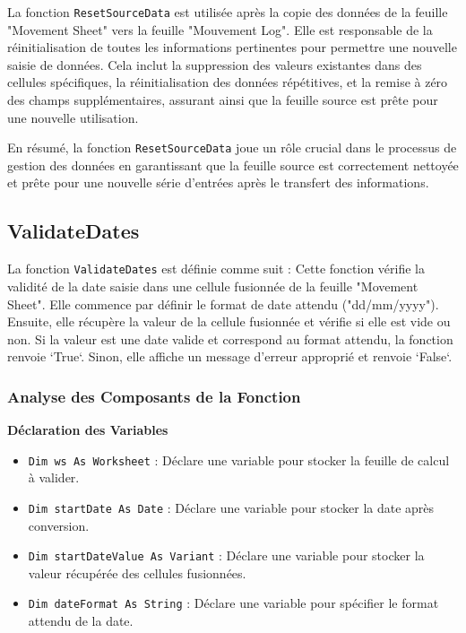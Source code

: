 \documentclass[a4paper, oneside, 12pt, final]{extreport}
\begin{document}
La fonction \texttt{ResetSourceData} est utilisée après la copie des données de la feuille "Movement Sheet" vers la feuille "Mouvement Log". Elle est responsable de la réinitialisation de toutes les informations pertinentes pour permettre une nouvelle saisie de données. Cela inclut la suppression des valeurs existantes dans des cellules spécifiques, la réinitialisation des données répétitives, et la remise à zéro des champs supplémentaires, assurant ainsi que la feuille source est prête pour une nouvelle utilisation.

En résumé, la fonction \texttt{ResetSourceData} joue un rôle crucial dans le processus de gestion des données en garantissant que la feuille source est correctement nettoyée et prête pour une nouvelle série d'entrées après le transfert des informations.
\subsection{ValidateDates}

La fonction \texttt{ValidateDates} est définie comme suit :
Cette fonction vérifie la validité de la date saisie dans une cellule fusionnée de la feuille "Movement Sheet". Elle commence par définir le format de date attendu ("dd/mm/yyyy"). Ensuite, elle récupère la valeur de la cellule fusionnée et vérifie si elle est vide ou non. Si la valeur est une date valide et correspond au format attendu, la fonction renvoie `True`. Sinon, elle affiche un message d'erreur approprié et renvoie `False`.
\subsubsection{Analyse des Composants de la Fonction}

\textbf{Déclaration des Variables}

\begin{itemize}
    \item \texttt{Dim ws As Worksheet} : Déclare une variable pour stocker la feuille de calcul à valider.
    \item \texttt{Dim startDate As Date} : Déclare une variable pour stocker la date après conversion.
    \item \texttt{Dim startDateValue As Variant} : Déclare une variable pour stocker la valeur récupérée des cellules fusionnées.
    \item \texttt{Dim dateFormat As String} : Déclare une variable pour spécifier le format attendu de la date.
\end{itemize}
\end{document}
